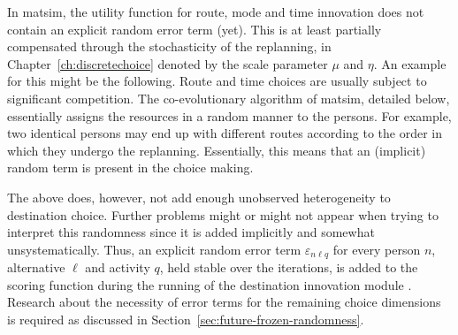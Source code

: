 In \gls{matsim}, the utility function for route, mode and time innovation does not contain an explicit random error term (yet). 
This is at least partially compensated through the stochasticity of the replanning, in Chapter~\ref{ch:discretechoice} denoted by the scale parameter $\mu$ and $\eta$.
An example for this might be the following.
Route and time choices are usually subject to significant competition. 
The co-evolutionary algorithm of \gls{matsim}, detailed below, essentially assigns the resources in a random manner to the persons. 
For example, two identical persons may end up with different routes according to the order in which they undergo the replanning. 
Essentially, this means that an (implicit) random term is present in the choice making.

The above does, however, not add enough unobserved heterogeneity to destination choice.
Further problems might or might not appear when trying to interpret this randomness since it is added implicitly and somewhat unsystematically.
Thus, an explicit random error term $\varepsilon_{n\ell q}$ for every person $n$, alternative $\ell$ and activity $q$, held stable over the iterations, is added to the scoring function during the running of the destination innovation module
\citep[][]{Horni_PhDThesis_2013}. 
Research about the necessity of error terms for the remaining choice dimensions is required as discussed in Section~\ref{sec:future-frozen-randomness}. %

